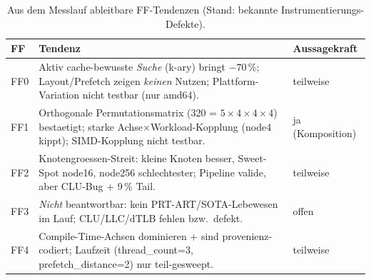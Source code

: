 \begin{table}[!htbp]\centering\small
\caption{Aus dem Messlauf ableitbare FF-Tendenzen (Stand: bekannte Instrumentierungs-Defekte).}
\label{tab:msd-ff}
\begin{tabular}{@{}l>{\raggedright\arraybackslash}p{8.2cm}l@{}}
\toprule
FF & Tendenz & Aussagekraft \\
\midrule
FF0 & Aktiv cache-bewusste \emph{Suche} (k-ary) bringt $-70\,\%$; Layout/Prefetch zeigen \emph{keinen} Nutzen; Plattform-Variation nicht testbar (nur amd64). & teilweise \\
FF1 & Orthogonale Permutationsmatrix (320 = $5\times4\times4\times4$) bestaetigt; starke Achse$\times$Workload-Kopplung (node4 kippt); SIMD-Kopplung nicht testbar. & ja (Komposition) \\
FF2 & Knotengroessen-Streit: kleine Knoten besser, Sweet-Spot node16, node256 schlechtester; Pipeline valide, aber CLU-Bug + 9\,\% Tail. & teilweise \\
FF3 & \emph{Nicht} beantwortbar: kein PRT-ART/SOTA-Lebewesen im Lauf; CLU/LLC/dTLB fehlen bzw.\ defekt. & offen \\
FF4 & Compile-Time-Achsen dominieren + sind provenienz-codiert; Laufzeit (thread\_count=3, prefetch\_distance=2) nur teil-gesweept. & teilweise \\
\bottomrule
\end{tabular}
\end{table}
